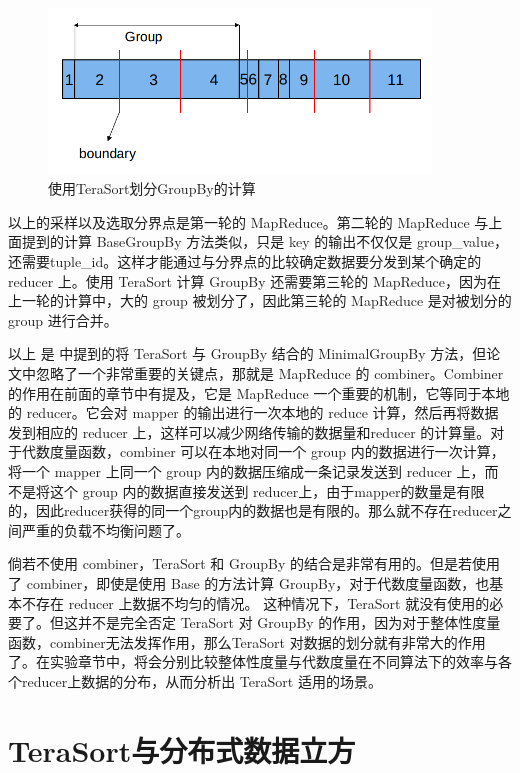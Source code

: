 \begin{figure}[!ht] 
\centering\includegraphics[width=4in]{picture/ch_terasort_mr/ts_groupby} 
\caption{使用TeraSort划分GroupBy的计算}\label{ts_groupby} 
\end{figure}

以上的采样以及选取分界点是第一轮的 MapReduce。第二轮的 MapReduce 与上面提到的计算 BaseGroupBy 方法类似，只是 key 的输出不仅仅是 group\_value，还需要tuple\_id。这样才能通过与分界点的比较确定数据要分发到某个确定的 reducer 上。使用 TeraSort 计算 GroupBy 还需要第三轮的 MapReduce，因为在上一轮的计算中，大的 group 被划分了，因此第三轮的 MapReduce 是对被划分的 group 进行合并。

以上 是 \cite{tao2013minimal} 中提到的将 TeraSort 与 GroupBy 结合的 MinimalGroupBy 方法，但论文中忽略了一个非常重要的关键点，那就是 MapReduce 的 combiner。Combiner的作用在前面的章节中有提及，它是 MapReduce 一个重要的机制，它等同于本地的 reducer。它会对 mapper 的输出进行一次本地的 reduce 计算，然后再将数据发到相应的 reducer 上，这样可以减少网络传输的数据量和reducer 的计算量。对于代数度量函数，combiner 可以在本地对同一个 group 内的数据进行一次计算，将一个 mapper 上同一个 group 内的数据压缩成一条记录发送到 reducer 上，而不是将这个 group 内的数据直接发送到 reducer上，由于mapper的数量是有限的，因此reducer获得的同一个group内的数据也是有限的。那么就不存在reducer之间严重的负载不均衡问题了。

倘若不使用 combiner，TeraSort 和 GroupBy 的结合是非常有用的。但是若使用了 combiner，即使是使用 Base 的方法计算 GroupBy，对于代数度量函数，也基本不存在 reducer 上数据不均匀的情况。 这种情况下，TeraSort 就没有使用的必要了。但这并不是完全否定 TeraSort 对 GroupBy 的作用，因为对于整体性度量函数，combiner无法发挥作用，那么TeraSort 对数据的划分就有非常大的作用了。在实验章节中，将会分别比较整体性度量与代数度量在不同算法下的效率与各个reducer上数据的分布，从而分析出 TeraSort 适用的场景。

\section{TeraSort与分布式数据立方}

